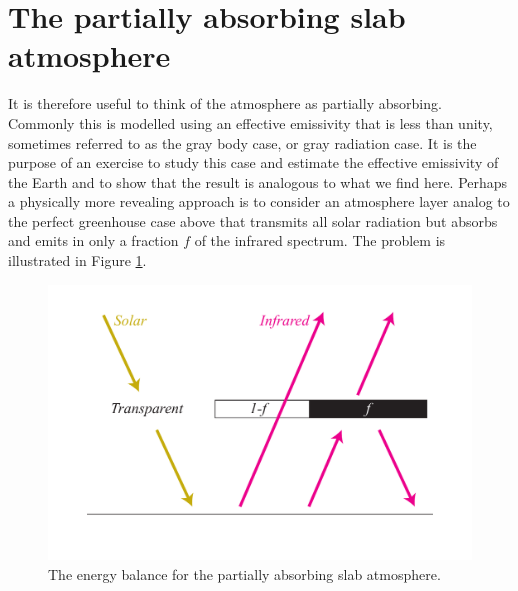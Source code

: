 \documentclass[12pt]{book}
\begin{document}
\section{The partially absorbing slab atmosphere}
It is therefore useful to think of the atmosphere as partially absorbing. Commonly this is modelled using an effective emissivity that is less than unity, sometimes referred to as the gray body case, or gray radiation case. 
It is the purpose of an exercise to study this case and estimate the effective emissivity of the Earth and to show that the result is analogous to what we find here. 
Perhaps a physically more revealing approach is to consider an atmosphere layer analog to the perfect greenhouse case above that transmits all solar radiation but absorbs and emits in only a fraction $f$ of the infrared spectrum. The problem is illustrated in Figure \ref{fig:partially_absorbing_atmosphere}.

\begin{figure}
\begin{center}
\includegraphics[width=12 cm]{../illustrations/Partially_absorbing_atmosphere}
\end{center}
\caption{ The energy balance for the partially absorbing slab atmosphere.    } 
\label{fig:partially_absorbing_atmosphere}
\end{figure}
\end{document}

